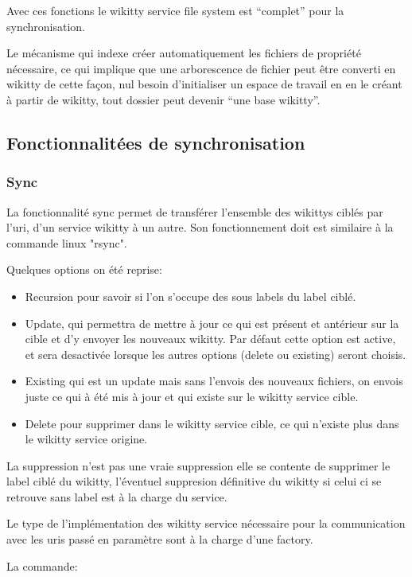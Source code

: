 Avec ces fonctions le wikitty service file system est ``complet'' pour la
synchronisation.

Le mécanisme qui indexe créer automatiquement les fichiers de propriété
nécessaire, ce qui implique que une arborescence de fichier peut être converti
en wikitty de cette façon, nul besoin d'initialiser un espace de travail en en
le créant à partir de wikitty, tout dossier peut devenir ``une base wikitty''.

\subsection{Fonctionnalitées de synchronisation}

\subsubsection{Sync}

La fonctionnalité sync permet de transférer l'ensemble des wikittys ciblés par 
l'uri, d'un service wikitty à un autre. Son fonctionnement doit est similaire à
la commande linux "rsync".

Quelques options on été reprise:
\begin{itemize}
\item Recursion pour savoir si l'on s'occupe des sous labels du label ciblé.
\item Update, qui permettra de mettre à jour ce qui est présent et antérieur
sur la cible et d'y envoyer les nouveaux wikitty. Par défaut cette option est
active, et sera desactivée lorsque les autres options (delete ou existing)
seront choisis.
\item Existing qui est un update mais sans l'envois des nouveaux fichiers, on
envois juste ce qui à été mis à jour et qui existe sur le wikitty service cible.
\item Delete pour supprimer dans le wikitty service cible, ce qui n'existe plus
dans le wikitty service origine.
\end{itemize}

La suppression n'est pas une vraie suppression elle se contente de supprimer le 
label ciblé du wikitty, l'éventuel suppresion définitive du wikitty si celui ci
se retrouve sans label est à la charge du service.

Le type de l'implémentation des wikitty service nécessaire pour la communication
avec les uris passé en paramètre sont à la charge d'une factory. 

La commande:

